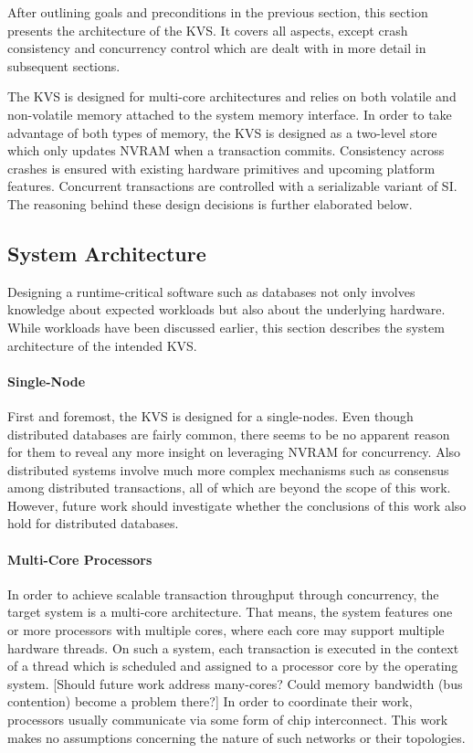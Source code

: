 After outlining goals and preconditions in the previous section, this section
presents the architecture of the KVS. It covers all aspects, except crash
consistency and concurrency control which are dealt with in more detail in
subsequent sections.

The KVS is designed for multi-core architectures and relies on both volatile and
non-volatile memory attached to the system memory interface. In order to take
advantage of both types of memory, the KVS is designed as a two-level store
which only updates NVRAM when a transaction commits. Consistency across crashes
is ensured with existing hardware primitives and upcoming platform features.
Concurrent transactions are controlled with a serializable variant of SI. The
reasoning behind these design decisions is further elaborated below.

\subsection{System Architecture}

Designing a runtime-critical software such as databases not only involves
knowledge about expected workloads but also about the underlying hardware. While
workloads have been discussed earlier, this section describes the system
architecture of the intended KVS.

\paragraph{Single-Node}

First and foremost, the KVS is designed for a single-nodes. Even though
distributed databases are fairly common, there seems to be no apparent reason
for them to reveal any more insight on leveraging NVRAM for concurrency. Also
distributed systems involve much more complex mechanisms such as consensus among
distributed transactions, all of which are beyond the scope of this work.
However, future work should investigate whether the conclusions of this work
also hold for distributed databases.

\paragraph{Multi-Core Processors}

In order to achieve scalable transaction throughput through concurrency, the
target system is a multi-core architecture. That means, the system features one
or more processors with multiple cores, where each core may support multiple
hardware threads. On such a system, each transaction is executed in the context
of a thread which is scheduled and assigned to a processor core by the operating
system. [Should future work address many-cores? Could memory bandwidth (bus
contention) become a problem there?] In order to coordinate their work,
processors usually communicate via some form of chip interconnect. This work
makes no assumptions concerning the nature of such networks or their topologies.

